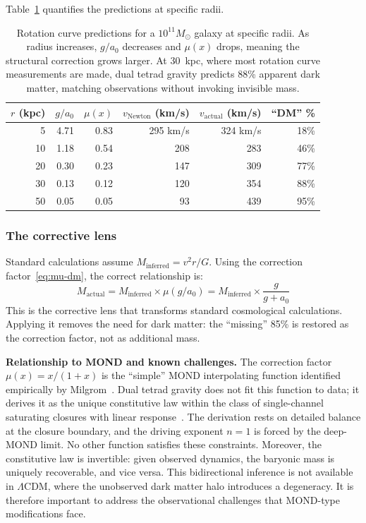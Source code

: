 \documentclass[aps,prd,preprint,superscriptaddress,showpacs,preprintnumbers,amsmath,amssymb,nofootinbib]{revtex4-2}
\begin{document}
Table~\ref{tab:darkmatter} quantifies the predictions at specific radii.

\begin{table}[H]
\centering
\begin{tabular*}{\textwidth}{@{\extracolsep{\fill}} rrrrrr @{}}
\toprule
$r$ (kpc) & $g/a_0$ & $\mu(x)$ & $v_{\text{Newton}}$ (km/s) & $v_{\text{actual}}$ (km/s) & ``DM'' \% \\
\midrule
5 & 4.71 & 0.83 & 295 km/s & 324 km/s & 18\% \\
10 & 1.18 & 0.54 & 208 & 283 & 46\% \\
20 & 0.30 & 0.23 & 147 & 309 & 77\% \\
30 & 0.13 & 0.12 & 120 & 354 & 88\% \\
50 & 0.05 & 0.05 & 93 & 439 & 95\% \\
\bottomrule
\end{tabular*}
\caption{Rotation curve predictions for a $10^{11} M_\odot$ galaxy at specific radii. As radius increases, $g/a_0$ decreases and $\mu(x)$ drops, meaning the structural correction grows larger. At 30~kpc, where most rotation curve measurements are made, dual tetrad gravity predicts 88\% apparent dark matter, matching observations without invoking invisible mass.}
\label{tab:darkmatter}
\end{table}

\subsubsection*{The corrective lens}

Standard calculations assume $M_{\text{inferred}} = v^2 r / G$. Using the correction factor~\eqref{eq:mu-dm}, the correct relationship is:
\begin{equation}
M_{\text{actual}} = M_{\text{inferred}} \times \mu(g/a_0) = M_{\text{inferred}} \times \frac{g}{g + a_0}
\label{eq:corrective-lens}
\end{equation}
This is the corrective lens that transforms standard cosmological calculations. Applying it removes the need for dark matter: the ``missing'' 85\% is restored as the correction factor, not as additional mass.

\textbf{Relationship to MOND and known challenges.} The correction factor $\mu(x) = x/(1+x)$ is the ``simple'' MOND interpolating function identified empirically by Milgrom~\cite{milgrom1983}. Dual tetrad gravity does not fit this function to data; it derives it as the unique constitutive law within the class of single-channel saturating closures with linear response~\cite{paper1}. The derivation rests on detailed balance at the closure boundary, and the driving exponent $n = 1$ is forced by the deep-MOND limit. No other function satisfies these constraints. Moreover, the constitutive law is invertible: given observed dynamics, the baryonic mass is uniquely recoverable, and vice versa. This bidirectional inference is not available in $\Lambda$CDM, where the unobserved dark matter halo introduces a degeneracy. It is therefore important to address the observational challenges that MOND-type modifications face.
\end{document}
